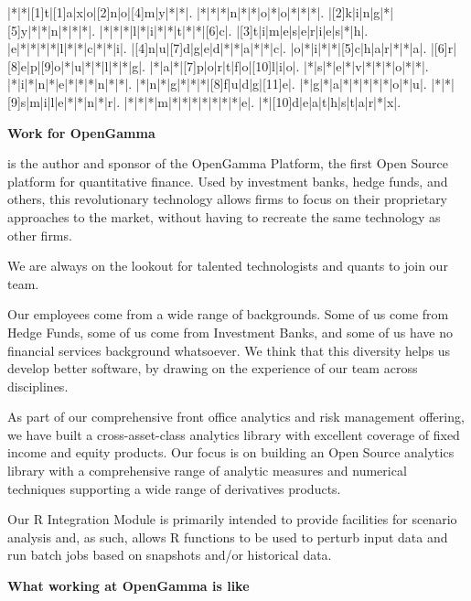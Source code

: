 \documentclass[custom, plainsections]{sciposter}
\begin{document}
\begin{multicols*}{3}
\begin{Puzzle}{12}{17}%
|*|*|[1]t|[1]a|x|o|[2]n|o|[4]m|y|*|*|.
|*|*|*|n|*|*|o|*|o|*|*|*|.
|[2]k|i|n|g|*|[5]y|*|*|n|*|*|*|.
|*|*|*|l|*|i|*|*|t|*|*|[6]c|.
|[3]t|i|m|e|s|e|r|i|e|s|*|h|.
|e|*|*|*|*|l|*|*|c|*|*|i|.
|[4]n|u|[7]d|g|e|d|*|*|a|*|*|c|.
|o|*|i|*|*|[5]c|h|a|r|*|*|a|.
|[6]r|[8]e|p|[9]o|*|u|*|*|l|*|*|g|.
|*|a|*|[7]p|o|r|t|f|o|[10]l|i|o|.
|*|s|*|e|*|v|*|*|*|o|*|*|.
|*|i|*|n|*|e|*|*|*|n|*|*|.
|*|n|*|g|*|*|*|[8]f|u|d|g|[11]e|.
|*|g|*|a|*|*|*|*|*|o|*|u|.
|*|*|[9]s|m|i|l|e|*|*|n|*|r|.
|*|*|*|m|*|*|*|*|*|*|*|e|.
|*|[10]d|e|a|t|h|s|t|a|r|*|x|.
\end{Puzzle}


\vfill
\columnbreak

\textbf{Work for OpenGamma}
\vspace{0.2cm}

 is the author and sponsor of the OpenGamma Platform, the first Open Source platform for quantitative finance. Used by investment banks, hedge funds, and others, this revolutionary technology allows firms to focus on their proprietary approaches to the market, without having to recreate the same technology as other firms.

We are always on the lookout for talented technologists and quants to join our team.

Our employees come from a wide range of backgrounds. Some of us come from Hedge Funds, some of us come from Investment Banks, and some of us have no financial services background whatsoever. We think that this diversity helps us develop better software, by drawing on the experience of our team across disciplines.

As part of our comprehensive front office analytics and risk management offering, we have built a cross-asset-class analytics library with excellent coverage of fixed income and equity products. Our focus is on building an Open Source analytics library with a comprehensive range of analytic measures and numerical techniques supporting a wide range of derivatives products.

Our R Integration Module is primarily intended to provide facilities for scenario analysis and, as such, allows R functions to be used to perturb input data and run batch jobs based on snapshots and/or historical data.

\vspace{0.2cm}
\textbf{What working at OpenGamma is like}
\vspace{0.2cm}


\end{multicols*}
\end{document}

